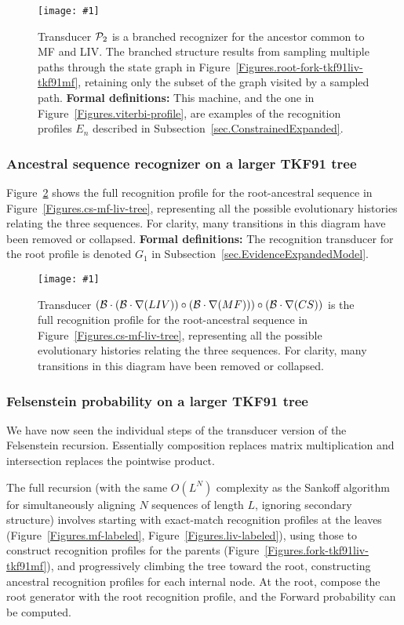 \documentclass{article}
\newcommand{\secref}[1]{Subsection~\ref{sec.#1}}
\newcommand{\figref}[1]{Figure~\ref{Figures.#1}}
\newcommand{\figlabel}[1]{\label{Figures.#1}}
\newcommand{\easyfig}[4]{
\begin{figure}
\texttt{[image: \#1]}
\caption{ \figlabel{#3} #4}
\end{figure}}
\newcommand{\widepngfig}[2]{\easyfig{#1.png}{width=\textwidth}{#1}{#2}}
\newcommand{\tallpdffig}[2]{\easyfig{#1-fig.pdf}{height=.8\textheight}{#1}{#2}}
\newcommand{\needfig}[1]{{\bf Need figure: } #1 }
\newcommand\tkf{{\cal B}}
\newcommand\profile{{\cal P}}
\newcommand\formaldefs{{\bf Formal definitions: }}
\newcommand\fork{\circ}
\newcommand\recognize{\nabla}
\begin{document}
\tallpdffig{forward2-profile}{Transducer $\profile_2$ is a branched recognizer for the 
ancestor common to MF and LIV.  The branched structure results from sampling
multiple paths through the state graph in \figref{root-fork-tkf91liv-tkf91mf}, 
retaining only the subset of the graph visited by a sampled path.
\formaldefs
This machine, and the one in \figref{viterbi-profile}, are examples of the recognition profiles $E_n$ described in \secref{ConstrainedExpanded}.  }

\subsubsection{Ancestral sequence recognizer on a larger TKF91 tree}

\figref{fork3-tkf91liv-tkf91mf-tkf91cs} 
shows  the full recognition profile for the 
root-ancestral sequence in \figref{cs-mf-liv-tree}, 
representing all the possible evolutionary histories relating the three sequences.  
For clarity, many transitions in this diagram have been removed or collapsed.
\formaldefs
The recognition transducer for the root profile is denoted $G_1$ in \secref{EvidenceExpandedModel}.

\widepngfig{fork3-tkf91liv-tkf91mf-tkf91cs}
{Transducer $(\tkf \cdot (\tkf \cdot \recognize(LIV))\fork(\tkf \cdot \recognize(MF)))\fork(\tkf \cdot \recognize(CS))$ 
is the full recognition profile for the root-ancestral sequence in \figref{cs-mf-liv-tree}, 
representing all the possible evolutionary histories relating the three sequences.  
For clarity, many transitions in this diagram have been removed or collapsed.
}

\subsubsection{Felsenstein probability on a larger TKF91 tree}

We have now seen the individual steps of the 
transducer version of the Felsenstein recursion.
Essentially composition replaces matrix multiplication and intersection replaces the 
pointwise product.  

The full recursion (with the same $O(L^N)$ complexity as the Sankoff algorithm \cite{SankoffCedergren83}
for simultaneously aligning $N$ sequences of length $L$, ignoring secondary structure)
involves starting with exact-match recognition profiles at the leaves (\figref{mf-labeled}, \figref{liv-labeled}),
using those to construct recognition profiles for the parents (\figref{fork-tkf91liv-tkf91mf}),
and progressively climbing the tree toward the root,
constructing ancestral recognition profiles for each internal node. 
At the root, compose the root generator with the root recognition profile,
and the Forward probability can be computed. 
\end{document}
